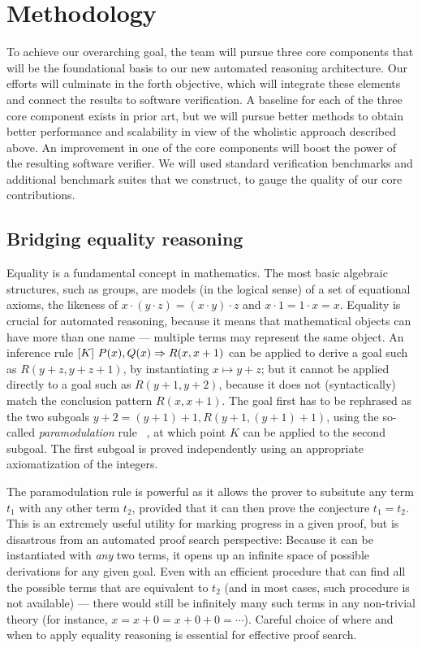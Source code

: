 \section{Methodology}

To achieve our overarching goal, the team will pursue three core components that will be the foundational basis to our new automated reasoning architecture.
Our efforts will culminate in the forth objective, which will integrate these elements and connect the results to software verification.
A baseline for each of the three core component exists in prior art, but we will pursue better methods to obtain better performance and scalability in view of the wholistic approach described above.
An improvement in one of the core components will boost the power of the resulting software verifier.
We will used standard verification benchmarks and additional benchmark suites that we construct, to gauge the quality of our core contributions.


\subsection{Bridging equality reasoning}

Equality is a fundamental concept in mathematics.
The most basic algebraic structures, such as groups,
are models (in the logical sense) of a set of equational
axioms, the likeness of $x\cdot(y\cdot z) = (x\cdot y)\cdot z$ and $x\cdot 1 = 1\cdot x = x$.
Equality is crucial for automated reasoning, because it means that mathematical objects can have more than one name --- multiple terms may represent the same object.
An inference rule $[K]~{P(x),Q(x)} \Rightarrow {R(x, x+1)}$
can be applied to derive a goal such as $R(y+z, y+z+1)$,
by instantiating $x\mapsto y+z$;
but it cannot be applied directly to a goal such as
$R(y+1, y+2)$, because it does not (syntactically) match the conclusion pattern $R(x,x+1)$.
The goal first has to be rephrased as the two subgoals
$y + 2 = (y + 1) + 1, R(y+1, (y+1)+1)$, using the so-called \emph{paramodulation} rule%
~\cite{Book2001:Nieuwenhuis},
at which point $K$ can be applied to the second subgoal.
The first subgoal is proved independently using an appropriate axiomatization of the integers.

The paramodulation rule is powerful as it allows the prover to subsitute any term $t_1$ with any other term $t_2$, provided that it can then prove the conjecture $t_1 = t_2$.
This is an extremely useful utility for marking progress in a given proof, but is disastrous from an automated proof search perspective:
Because it can be instantiated with \emph{any} two terms, it opens up an infinite space of possible derivations for any given goal.
Even with an efficient procedure that can find all the possible terms that are equivalent to $t_2$ (and in most cases, such procedure is not available) ---
there would still be infinitely many such terms in any non-trivial theory (for instance, $x = x + 0 = x + 0 + 0 = \cdots$).
Careful choice of where and when to apply equality reasoning is essential for effective proof search.

